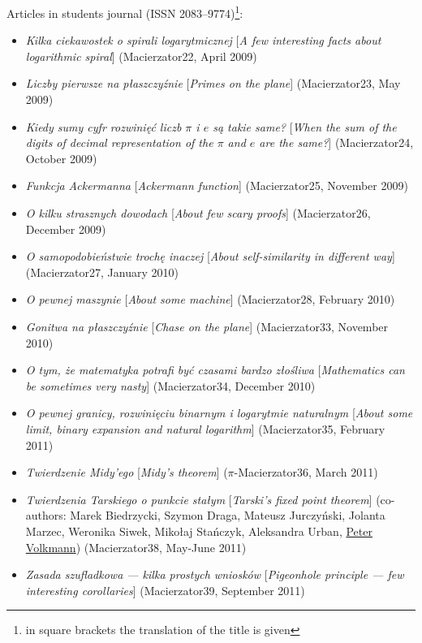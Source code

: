 \noindent Articles in students journal \macierzator{} (ISSN 2083--9774)\footnote{in square brackets the translation of the title is given}:
\begin{itemize}
  \item \textsl{Kilka ciekawostek o spirali logarytmicznej} [\textsl{A few interesting facts about logarithmic spiral}] (Macierzator22, April 2009)
  \item \textsl{Liczby pierwsze na płaszczyźnie} [\textsl{Primes on the plane}] (Macierzator23, May 2009)
  \item \textsl{Kiedy sumy cyfr rozwinięć liczb $\pi$ i $e$ są takie same?} [\textsl{When the sum of the digits of decimal representation of the $\pi$ and $e$ are the same?}] (Macierzator24, October 2009)
  \item \textsl{Funkcja Ackermanna} [\textsl{Ackermann function}] (Macierzator25, November 2009)
  \item \textsl{O kilku strasznych dowodach} [\textsl{About few scary proofs}] (Macierzator26, December 2009)
  \item \textsl{O samopodobieństwie  trochę inaczej} [\textsl{About self-similarity in different way}] (Macierzator27, January 2010)
  \item \textsl{O pewnej maszynie} [\textsl{About some machine}] (Macierzator28, February 2010)
  \item \textsl{Gonitwa na płaszczyźnie} [\textsl{Chase on the plane}] (Macierzator33, November 2010)
  \item \textsl{O tym, że matematyka potrafi być czasami bardzo złośliwa} [\textsl{Mathematics can be sometimes very nasty}] (Macierzator34, December 2010)
  \item \textsl{O pewnej granicy, rozwinięciu binarnym i logarytmie naturalnym} [\textsl{About some limit, binary expansion and natural logarithm}] (Macierzator35, February 2011)
  \item \textsl{Twierdzenie Midy'ego} [\textsl{Midy's theorem}] ($\pi$-Macierzator36, March 2011)
  \item \textsl{Twierdzenia Tarskiego o punkcie stałym} [\textsl{Tarski's fixed point theorem}] (co-authors: Marek Biedrzycki, Szymon Draga, Mateusz Jurczyński, Jolanta Marzec, Weronika Siwek, Mikołaj Stańczyk, Aleksandra Urban, \href{\urlVolkmann}{Peter Volkmann}) (Macierzator38, May-June 2011)
  \item \textsl{Zasada szufladkowa --- kilka prostych wniosków} [\textsl{Pigeonhole principle --- few interesting corollaries}] (Macierzator39, September 2011)

\end{itemize}
